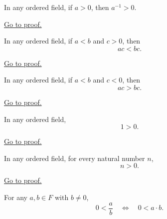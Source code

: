 \begin{theorem}
\label{thm:inverse-positive}
In any ordered field, if $a>0$, then $a^{-1}>0$.
\end{theorem}

\begin{remark*}[Proof]
\hyperref[prf:inverse-positive]{Go to proof.}
\end{remark*}

\begin{theorem}
\label{thm:multiply-positive}
In any ordered field, if $a<b$ and $c>0$, then
\[
ac<bc.
\]
\end{theorem}

\begin{remark*}[Proof]
\hyperref[prf:multiply-positive]{Go to proof.}
\end{remark*}

\begin{theorem}
\label{thm:multiply-negative}
In any ordered field, if $a<b$ and $c<0$, then
\[
ac>bc.
\]
\end{theorem}

\begin{remark*}[Proof]
\hyperref[prf:multiply-negative]{Go to proof.}
\end{remark*}

\begin{theorem}[$1$ Is Positive]
\label{thm:one-positive}
In any ordered field,
\[
1>0.
\]
\end{theorem}

\begin{remark*}[Proof]
\hyperref[prf:one-positive]{Go to proof.}
\end{remark*}

\begin{corollary}
\label{cor:n-positive}
In any ordered field, for every natural number $n$,
\[
n>0.
\]
\end{corollary}

\begin{remark*}[Proof]
\hyperref[prf:n-positive]{Go to proof.}
\end{remark*}

\begin{theorem}
\label{thm:positive-fraction-iff-positive-product}
For any $a,b\in F$ with $b\neq 0$,
\[
0<\frac{a}{b}
\quad\Longleftrightarrow\quad
0<a\cdot b.
\]
\end{theorem}

